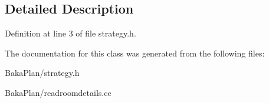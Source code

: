 \subsection{Detailed Description}


Definition at line 3 of file strategy.\-h.



The documentation for this class was generated from the following files\-:\begin{DoxyCompactItemize}
\item 
Baka\-Plan/strategy.\-h\item 
Baka\-Plan/readroomdetails.\-cc\end{DoxyCompactItemize}
